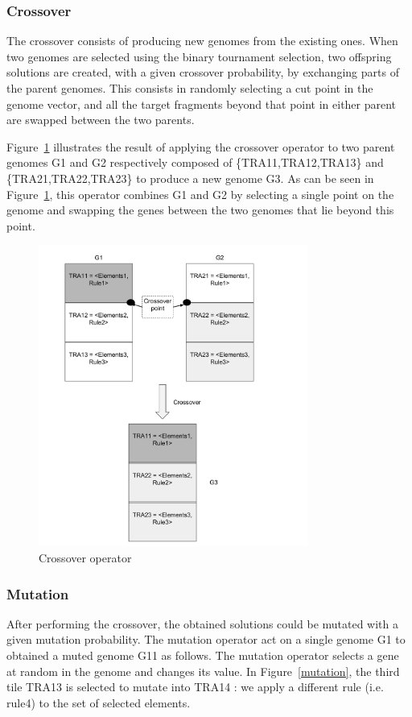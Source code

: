 \documentclass[conference]{IEEEtran}
\begin{document}
\subsubsection{\textbf{Crossover}}
The crossover consists of producing new genomes from the existing ones. When two genomes are selected using the binary tournament selection, two offspring solutions are created, with a given crossover probability, by exchanging parts of the parent genomes. This consists in randomly selecting a cut point in the genome vector, and all the target fragments beyond that point in either parent are swapped between the two parents.

Figure~\ref{crossover} illustrates the result of applying the crossover operator to two parent genomes G1 and G2 respectively composed of \{TRA11,TRA12,TRA13\} and \{TRA21,TRA22,TRA23\} to produce a new genome G3. As can be seen in Figure~\ref{crossover}, this operator combines G1 and G2 by selecting a single point on the genome and swapping the genes between the two genomes that lie beyond this point. 

\begin{figure}[!t]
\centering
\includegraphics[width=3.49in]{crossover.pdf}
\caption{Crossover operator}
\label{crossover}
\end{figure}

\subsubsection{\textbf{Mutation}}
After performing the crossover, the obtained solutions could be mutated with a given mutation probability.
The mutation operator act on a single genome G1 to obtained a muted genome G11 as follows. The mutation operator selects a gene at random in the genome and changes its value. In Figure~\ref{mutation}, the third tile TRA13 is selected to mutate into TRA14 : we apply a different rule (i.e. rule4) to the set of selected elements.
\end{document}
